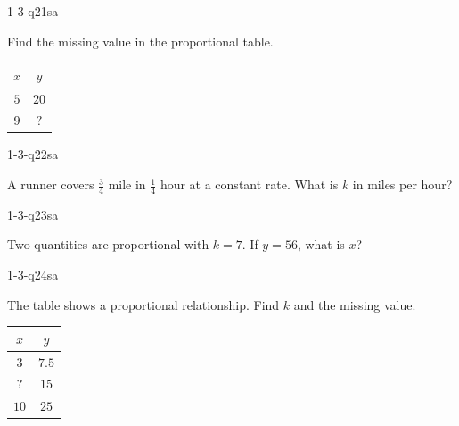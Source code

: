 \begin{practiceQuestion}{1-3-q21}{sa}
\begin{questionText}
Find the missing value in the proportional table.

\begin{center}
\begin{tabular}{|c|c|}
\hline $x$ & $y$ \\ \hline $5$ & $20$ \\ $9$ & $?$ \\ \hline
\end{tabular}
\end{center}
\end{questionText}
\end{practiceQuestion}

\begin{practiceQuestion}{1-3-q22}{sa}
\begin{questionText}
A runner covers $\frac{3}{4}$ mile in $\frac{1}{4}$ hour at a constant rate. What is $k$ in miles per hour?
\end{questionText}
\end{practiceQuestion}

\begin{practiceQuestion}{1-3-q23}{sa}
\begin{questionText}
Two quantities are proportional with $k = 7$. If $y = 56$, what is $x$?
\end{questionText}
\end{practiceQuestion}

\begin{practiceQuestion}{1-3-q24}{sa}
\begin{questionText}
The table shows a proportional relationship. Find $k$ and the missing value.

\begin{center}
\begin{tabular}{|c|c|}
\hline $x$ & $y$ \\ \hline $3$ & $7.5$ \\ $?$ & $15$ \\ $10$ & $25$ \\ \hline
\end{tabular}
\end{center}
\end{questionText}
\end{practiceQuestion}

